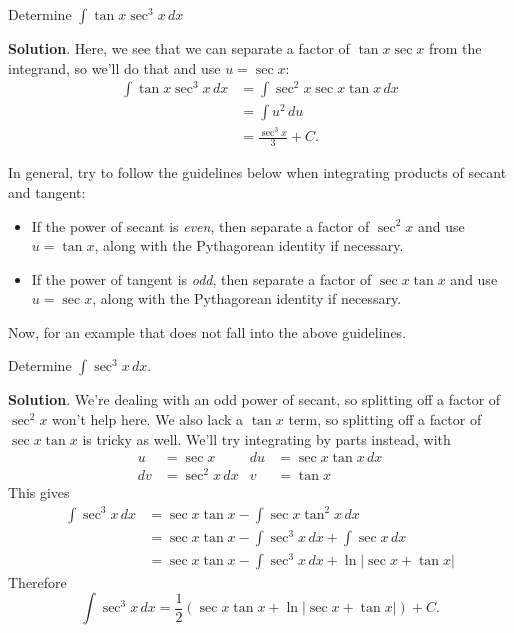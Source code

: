 \documentclass[10pt,]{book}
\theoremstyle{ptxplainnotitle}
\theoremstyle{ptxplaintitle}
\theoremstyle{ptxplainnotitle}
\theoremstyle{ptxplaintitle}
\theoremstyle{ptxplainnotitle}
\theoremstyle{ptxplaintitle}
\theoremstyle{ptxdefinitionnotitle}
\theoremstyle{ptxdefinitiontitle}
\theoremstyle{ptxdefinitionnotitle}
\theoremstyle{ptxdefinitiontitle}
\theoremstyle{ptxdefinitionnotitle}
\theoremstyle{ptxdefinitiontitle}
\theoremstyle{ptxdefinitionnotitle}
\theoremstyle{ptxdefinitiontitle}
\theoremstyle{ptxdefinitionnotitle}
\theoremstyle{ptxdefinitiontitle}
\numberwithin{equation}{section}
\begin{document}
\begin{example}\label{example-integrating-a-product-of-tangent-and-secant}
\hypertarget{p-535}{}%
Determine \(\int\tan x\sec^{3} x\,dx\)%
\par\smallskip%
\noindent\textbf{Solution}.\hypertarget{solution-118}{}\quad%
\hypertarget{p-536}{}%
Here, we see that we can separate a factor of \(\tan x\sec x\) from the integrand, so we'll do that and use \(u = \sec x\):%
%
\begin{align*}
\int\tan x\sec^{3}x\,dx & = \int \sec^{2}x \sec x\tan x\,dx \\
& = \int u^{2}\,du \\
& = \frac{\sec^{3}x}{3} + C. 
\end{align*}
\end{example}
\hypertarget{p-537}{}%
In general, try to follow the guidelines below when integrating products of secant and tangent: \leavevmode%
\begin{itemize}[label=\textbullet]
\item{}If the power of secant is \emph{even}, then separate a factor of \(\sec^{2}x\) and use \(u = \tan x\), along with the Pythagorean identity if necessary.%
\item{}If the power of tangent is \emph{odd}, then separate a factor of \(\sec x\tan x\) and use \(u = \sec x\), along with the Pythagorean identity if necessary.%
\end{itemize}
%
\par
\hypertarget{p-538}{}%
Now, for an example that does not fall into the above guidelines.%
\begin{example}\label{example-integrating-secant-cubed}
\hypertarget{p-539}{}%
Determine \(\int\sec^{3}x\,dx\).%
\par\smallskip%
\noindent\textbf{Solution}.\hypertarget{solution-119}{}\quad%
\hypertarget{p-540}{}%
We're dealing with an odd power of secant, so splitting off a factor of \(\sec^{2}x\) won't help here. We also lack a \(\tan x\) term, so splitting off a factor of \(\sec x\tan x\) is tricky as well. We'll try integrating by parts instead, with%
\begin{align*}
u & = \sec x & du & = \sec x\tan x\,dx\\
dv & = \sec^{2}x\,dx & v & = \tan x 
\end{align*}
This gives%
%
\begin{align*}
\int\sec^{3}x\,dx & = \sec x\tan x - \int \sec x\tan^{2}x\,dx \\
& = \sec x\tan x - \int\sec^{3}x\,dx + \int\sec x\,dx \\
& = \sec x\tan x - \int\sec^{3}x\,dx + \ln|\sec x + \tan x| 
\end{align*}
\hypertarget{p-541}{}%
Therefore%
\begin{equation*}
\int\sec^{3}x\,dx = \frac{1}{2}(\sec x\tan x + \ln|\sec x + \tan x|) + C.
\end{equation*}
%
\end{example}
\typeout{************************************************}
\typeout{************************************************}
\end{document}

